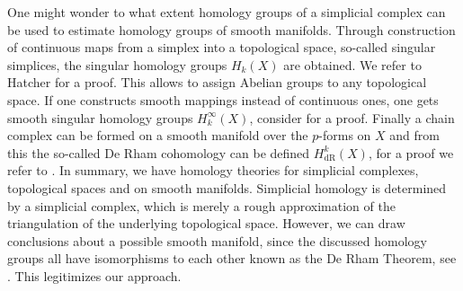 \documentclass[runningheads,orivec]{llncs}
\begin{document}
One might wonder to what extent homology groups of a simplicial complex can be used to estimate homology groups of smooth manifolds. Through construction of continuous maps from a simplex into a topological space, so-called singular simplices, the singular homology groups $H_{k}(X)$ are obtained. We refer to Hatcher \cite[p.~102]{hatcher2002algebraic} for a proof. This allows to assign Abelian groups to any topological space. If one constructs smooth mappings instead of continuous ones, one gets smooth singular homology groups $H^{\infty}_{k}(X)$, consider \cite[pp.~473]{lee2013smooth} for a proof. Finally a chain complex can be formed on a smooth manifold over the $p$-forms on $X$ and from this the so-called De Rham cohomology can be defined $H_{\text{dR}}^{k}(X)$, for a proof we refer to \cite[pp.~440]{lee2013smooth}. In summary, we have homology theories for simplicial complexes, topological spaces and on smooth manifolds. Simplicial homology is determined by a simplicial complex, which is merely a rough approximation of the triangulation of the underlying topological space. However, we can draw conclusions about a possible smooth manifold, since the discussed homology groups all have isomorphisms to each other known as the De Rham Theorem, see \cite[pp.~106, pp.~467]{hatcher2002algebraic,lee2013smooth}. This legitimizes our approach.
\end{document}
